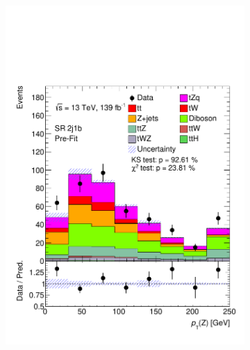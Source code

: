 \begin{figure}[h!] 
  \begin{subfigure}[b]{0.33\linewidth}
    \centering
    \includegraphics[width=\linewidth]{ubonn-thesis/Chapters/Chapters_05/Figure/SR/SR_2j1b_Z_pt.pdf} 
  \end{subfigure}%
  \begin{subfigure}[b]{0.33\linewidth}
    \centering

\end{subfigure}
\end{figure}
